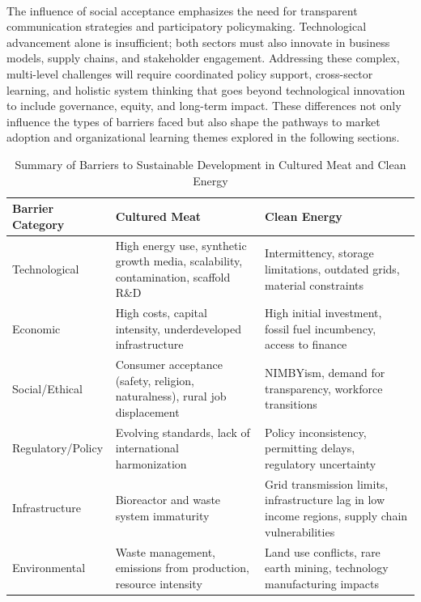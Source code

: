 	\paragraph*{} The influence of social acceptance emphasizes the need for transparent communication strategies and participatory policymaking. Technological advancement alone is insufficient; both sectors must also innovate in business models, supply chains, and stakeholder engagement. Addressing these complex, multi-level challenges will require coordinated policy support, cross-sector learning, and holistic system thinking that goes beyond technological innovation to include governance, equity, and long-term impact. These differences not only influence the types of barriers faced but also shape the pathways to market adoption and organizational learning themes explored in the following sections.
	
\begin{table}[h!]
	\centering
	\caption{Summary of Barriers to Sustainable Development in Cultured Meat and Clean Energy}
	\label{tab:barriers_summary}
	\begin{tabularx}{\textwidth}{@{}lXX@{}}
		\toprule
		\textbf{Barrier Category} & \textbf{Cultured Meat}                                                                     & \textbf{Clean Energy}                                                              \\ \midrule
		Technological             & High energy use, synthetic growth media, scalability, contamination, scaffold R\&D          & Intermittency, storage limitations, outdated grids, material constraints        \\ \addlinespace
		Economic                  & High costs, capital intensity, underdeveloped infrastructure                             & High initial investment, fossil fuel incumbency, access to finance             \\ \addlinespace
		Social/Ethical            & Consumer acceptance (safety, religion, naturalness), rural job displacement              & NIMBYism, demand for transparency, workforce transitions                       \\ \addlinespace
		Regulatory/Policy         & Evolving standards, lack of international harmonization                                  & Policy inconsistency, permitting delays, regulatory uncertainty                \\ \addlinespace
		Infrastructure            & Bioreactor and waste system immaturity                                                   & Grid transmission limits, infrastructure lag in low income regions, supply chain vulnerabilities \\ \addlinespace
		Environmental             & Waste management, emissions from production, resource intensity                          & Land use conflicts, rare earth mining, technology manufacturing impacts        \\ \bottomrule
	\end{tabularx}
\end{table}
	
